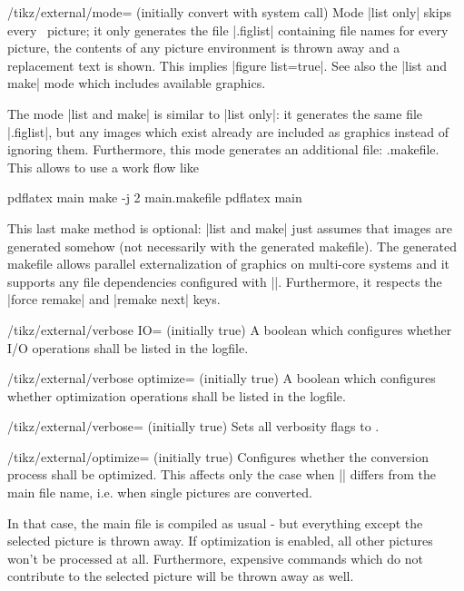 {\begin{key}{/tikz/external/mode= (initially convert with system call)}
	Mode |list only| skips every \tikzname\ picture; it only generates the file |.figlist| containing file names for every picture, the contents of any picture environment is thrown away and a replacement text is shown. This implies |figure list=true|. See also the |list and make| mode which includes available graphics.

	The mode |list and make| is similar to |list only|: it generates the same file |.figlist|, but any images which exist already are included as graphics instead of ignoring them. Furthermore, this mode generates an additional file: .makefile. This allows to use a work flow like
\begin{codeexample}
pdflatex main
make -j 2 main.makefile
pdflatex main
\end{codeexample}
	\noindent This last make method is optional: |list and make| just assumes that images are generated somehow (not necessarily with the generated makefile). The generated makefile allows parallel externalization of graphics on multi-core systems and it supports any file dependencies configured with |\tikzpicturedependsonfile|. Furthermore, it respects the |force remake| and |remake next| keys.


\end{key}


\begin{key}{/tikz/external/verbose IO= (initially true)}
	A boolean which configures whether I/O operations shall be listed in the logfile.
\end{key}
\begin{key}{/tikz/external/verbose optimize= (initially true)}
	A boolean which configures whether optimization operations shall be listed in the logfile.
\end{key}
\begin{key}{/tikz/external/verbose= (initially true)}
	Sets all verbosity flags to .
\end{key}

\begin{key}{/tikz/external/optimize= (initially true)}
	Configures whether the conversion process shall be optimized. This affects only the case when |\jobname| differs from the main file name, i.e. when single pictures are converted.

	In that case, the main file is compiled as usual - but everything except the selected picture is thrown away. If optimization is enabled, all other pictures won't be processed at all. Furthermore, expensive commands which do not contribute to the selected picture will be thrown away as well.


\end{key}}
